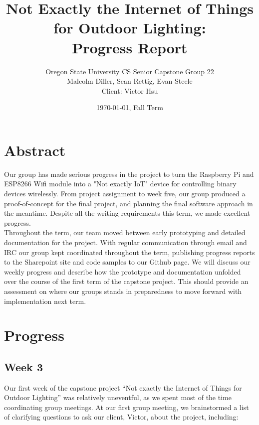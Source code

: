 \documentclass[letterpaper,10pt]{article}
\title{Not Exactly the Internet of Things for Outdoor Lighting:\\Progress Report}
\author{Oregon State University CS Senior Capstone Group 22\\Malcolm Diller, Sean Rettig, Evan Steele\\Client: Victor Hsu}
\date{\today, Fall Term}
\begin{document}
\maketitle

\section{Abstract}

Our group has made serious progress in the project to turn the Raspberry Pi and
ESP8266 Wifi module into a "Not exactly IoT" device for controlling 
binary devices wirelessly. From project assignment to week five, our group
produced a proof-of-concept for the final project, and planning the final
software approach in the meantime. Despite all the writing requirements this 
term, we made excellent progress.\\
Throughout the term, our team moved between early prototyping and detailed 
documentation for the project. With regular communication through email and IRC
our group kept coordinated throughout the term, publishing progress reports to
the Sharepoint site and code samples to our Github page. We will discuss our 
weekly progress and describe how the prototype and documentation unfolded over the 
course of the first term of the capstone project. This should provide an assessment
on where our groups stands in preparedness to move forward with implementation next term.

\pagebreak

\section{Progress}

\subsection{Week 3}

Our first week of the capstone project ``Not exactly the Internet of Things for
Outdoor Lighting'' was relatively uneventful, as we spent most of the time
coordinating group meetings.  At our first group meeting, we brainstormed a
list of clarifying questions to ask our client, Victor, about the project,
including:
\end{document}
